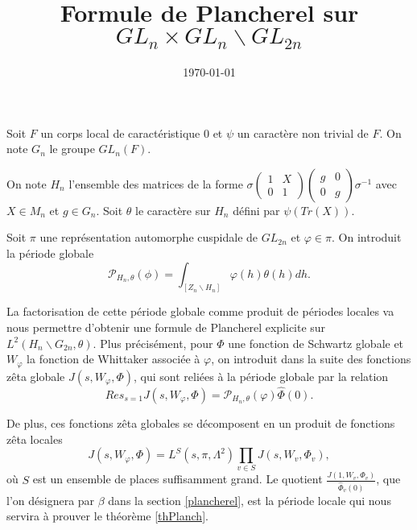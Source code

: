 \documentclass{amsart}
\begin{document}
\title{Formule de Plancherel sur $GL_n \times GL_n \backslash GL_{2n}$}
\date{\today}
\maketitle

Soit $F$ un corps local de caractéristique $0$ et $\psi$ un caractère non trivial de $F$. On note $G_n$ le groupe $GL_n(F)$.

On note $H_n$ l'ensemble des matrices de la forme $\sigma \begin{pmatrix}
1 & X \\
0 & 1
\end{pmatrix}\begin{pmatrix}
g & 0 \\
0 & g
\end{pmatrix} \sigma^{-1}$ avec $X \in M_n$ et $g \in G_n$. Soit $\theta$ le caractère sur $H_n$ défini par $\psi(Tr(X))$.

Soit $\pi$ une représentation automorphe cuspidale de $GL_{2n}$ et $\varphi \in \pi$. On introduit la période globale
\begin{equation}
\mathcal{P}_{H_n, \theta}(\phi) = \int_{[Z_n \backslash H_n]} \varphi(h) \theta(h) dh.
\end{equation}

La factorisation de cette période globale comme produit de périodes locales va nous permettre d'obtenir une formule de Plancherel explicite sur $L^2(H_n \backslash G_{2n}, \theta)$. Plus précisément, pour $\Phi$ une fonction de Schwartz globale et $W_\varphi$ la fonction de Whittaker associée à $\varphi$, on introduit dans la suite des fonctions zêta globale $J(s, W_\varphi, \Phi)$, qui sont reliées à la période globale par la relation
\begin{equation}
Res_{s=1} J(s, W_\varphi, \Phi) = \mathcal{P}_{H_n, \theta}(\varphi) \widehat{\Phi}(0).
\end{equation}

De plus, ces fonctions zêta globales se décomposent en un produit de fonctions zêta locales
\begin{equation}
J(s, W_\varphi, \Phi) = L^S(s, \pi, \Lambda^2) \prod_{v \in S} J(s, W_v, \Phi_v),
\end{equation}
où $S$ est un ensemble de places suffisamment grand. Le quotient $\frac{J(1, W_v, \Phi_v)}{\widehat{\Phi}_v(0)}$, que l'on désignera par $\beta$ dans la section \ref{plancherel}, est la période locale qui nous servira à prouver le théorème \ref{thPlanch}.
\end{document}
